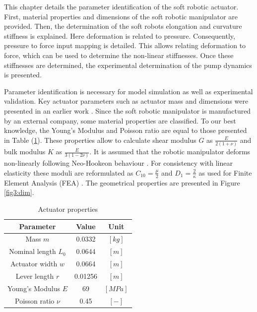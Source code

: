 \label{chap3}

This chapter details the parameter identification of the soft robotic actuator. First, material properties and dimensions of the soft robotic manipulator are provided. Then, the determination of the soft robots elongation and curvature stiffness is explained. Here deformation is related to pressure. Consequently, pressure to force input mapping is detailed. This allows relating deformation to force, which can be used to determine the non-linear stiffnesses. Once these stiffnesses are determined, the experimental determination of the pump dynamics is presented. 


Parameter identification is necessary for model simulation as well as experimental validation. Key actuator parameters such as actuator mass and dimensions were presented in an earlier work \cite{berkers}. Since the soft robotic manipulator is manufactured by an external company, some material properties are classified. To our best knowledge, the Young's Modulus and Poisson ratio are equal to those presented in Table (\ref{tab4:parameters}). These properties allow to calculate shear modulus $G$ as $\frac{E}{2(1+\nu)}$ and bulk modulus $K$ as $\frac{E}{3(1-2\nu)}$. It is assumed that the robotic manipulator deforms non-linearly following Neo-Hookeon behaviour \cite{Caasenbrood2020StiffnessModel}. For consistency with linear elasticity these moduli are reformulated as $C_{10} = \frac{\mu}{2}$ and $D_{1} = \frac{2}{\kappa}$ as used for Finite Element Analysis (FEA) \cite{neohookean}. The geometrical properties are presented in Figure \ref{fig3:dim}.


\begin{table}[H]
    \centering
    \caption{Actuator properties}
    \begin{tabular}{|c|c|c|} \hline
      \textbf{Parameter}   &  \textbf{Value} & \textbf{Unit} \\ \hline
      Mass $m$             &    0.0332       & $[kg]$ \\ 
      Nominal length $L_0$ &    0.0644       & $[m]$  \\ 
      Actuator width  $w$     &    0.0664    & $[m]$  \\
      Lever length $r$     &    0.01256      & $[m]$  \\ 
      Young's Modulus $E$  &    69           & $[MPa]$\\ 
      Poisson ratio $\nu$ &    0.45          & $[-]$ \\ \hline
    \end{tabular}
    \label{tab4:parameters}
\end{table}

